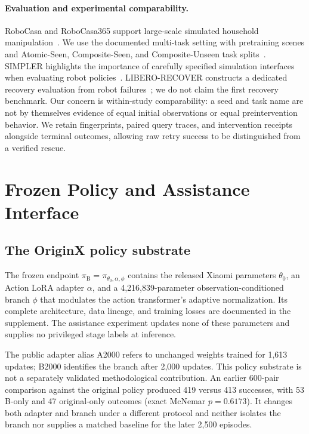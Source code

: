 \documentclass[10pt,twocolumn,letterpaper]{article}
\newcommand{\policy}{\pi_{\mathrm B}}
\begin{document}
\paragraph{Evaluation and experimental comparability.}
RoboCasa and RoboCasa365 support large-scale simulated household manipulation~\cite{robocasa,robocasa365}. We use the documented multi-task setting with pretraining scenes and Atomic-Seen, Composite-Seen, and Composite-Unseen task splits~\cite{protocol}. SIMPLER highlights the importance of carefully specified simulation interfaces when evaluating robot policies~\cite{simpler}. LIBERO-RECOVER constructs a dedicated recovery evaluation from robot failures~\cite{liberorecover}; we do not claim the first recovery benchmark. Our concern is within-study comparability: a seed and task name are not by themselves evidence of equal initial observations or equal preintervention behavior. We retain fingerprints, paired query traces, and intervention receipts alongside terminal outcomes, allowing raw retry success to be distinguished from a verified rescue.

\section{Frozen Policy and Assistance Interface}
\label{sec:method}
\subsection{The OriginX policy substrate}
The frozen endpoint $\policy=\pi_{\theta_0,\alpha,\phi}$ contains the released Xiaomi parameters $\theta_0$, an Action LoRA adapter $\alpha$, and a 4,216,839-parameter observation-conditioned branch $\phi$ that modulates the action transformer's adaptive normalization. Its complete architecture, data lineage, and training losses are documented in the supplement. The assistance experiment updates none of these parameters and supplies no privileged stage labels at inference.

The public adapter alias A2000 refers to unchanged weights trained for 1,613 updates; B2000 identifies the branch after 2,000 updates. This policy substrate is not a separately validated methodological contribution. An earlier 600-pair comparison against the original policy produced 419 versus 413 successes, with 53 B-only and 47 original-only outcomes (exact McNemar $p=0.6173$). It changes both adapter and branch under a different protocol and neither isolates the branch nor supplies a matched baseline for the later 2,500 episodes.
\end{document}
